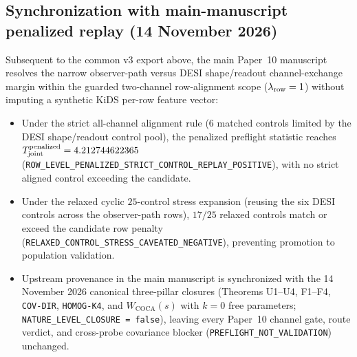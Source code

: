 \documentclass[11pt]{article}
\begin{document}
\subsection{Synchronization with main-manuscript penalized replay (14 November 2026)}

Subsequent to the common v3 export above, the main Paper~10 manuscript resolves
the narrow observer-path versus DESI shape/readout channel-exchange margin
within the guarded two-channel row-alignment scope ($\lambda_{\rm row}=1$)
without imputing a synthetic KiDS per-row feature vector:
\begin{itemize}[leftmargin=1.5em]
\item Under the strict all-channel alignment rule ($6$ matched controls limited
by the DESI shape/readout control pool), the penalized preflight statistic reaches
$T_{\rm joint}^{\rm penalized}=\allowbreak 4.212744622365$
(\texttt{ROW\_\allowbreak{}LEVEL\_\allowbreak{}PENALIZED\_\allowbreak{}STRICT\_\allowbreak{}CONTROL\_\allowbreak{}REPLAY\_\allowbreak{}POSITIVE}),
with no strict aligned control exceeding the candidate.
\item Under the relaxed cyclic $25$-control stress expansion (reusing the six
DESI controls across the observer-path rows), $17/25$ relaxed controls match or
exceed the candidate row penalty
(\texttt{RELAXED\_\allowbreak{}CONTROL\_\allowbreak{}STRESS\_\allowbreak{}CAVEATED\_\allowbreak{}NEGATIVE}),
preventing promotion to population validation.
\item Upstream provenance in the main manuscript is synchronized with the 14
November 2026 canonical three-pillar closures (Theorems U1--U4, F1--F4,
\texttt{COV-DIR}, \texttt{HOMOG-K4}, and $W_{\mathrm{COCA}}(s)$ with $k=0$ free
parameters; \texttt{NATURE\_\allowbreak{}LEVEL\_\allowbreak{}CLOSURE = false}),
leaving every Paper~10 channel gate, route verdict, and cross-probe covariance
blocker (\texttt{PREFLIGHT\_\allowbreak{}NOT\_\allowbreak{}VALIDATION})
unchanged.
\end{itemize}



\end{document}
